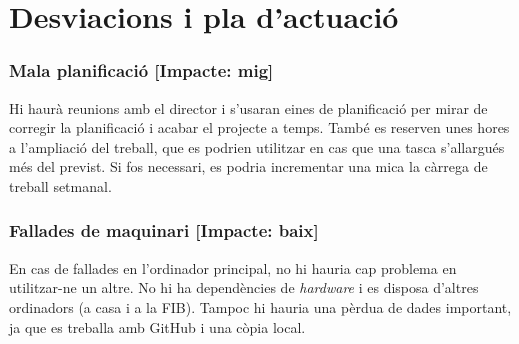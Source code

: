 \section{Desviacions i pla d'actuació}
	\subsubsection{Mala planificació [Impacte: mig]}
		Hi haurà reunions amb el director i s'usaran eines de planificació per mirar de corregir la planificació i acabar el projecte a temps. També es reserven unes hores a l'ampliació del treball,
		que es podrien utilitzar en cas que una tasca s'allargués més del previst. Si fos necessari, es podria incrementar una mica la càrrega de treball setmanal.
	\subsubsection{Fallades de maquinari [Impacte: baix]}
		En cas de fallades en l'ordinador principal, no hi hauria cap problema en utilitzar-ne un altre. No hi ha dependències de \textit{hardware} i es disposa d'altres ordinadors (a casa i a la FIB).
		Tampoc hi hauria una pèrdua de dades important, ja que es treballa amb GitHub i una còpia local.
